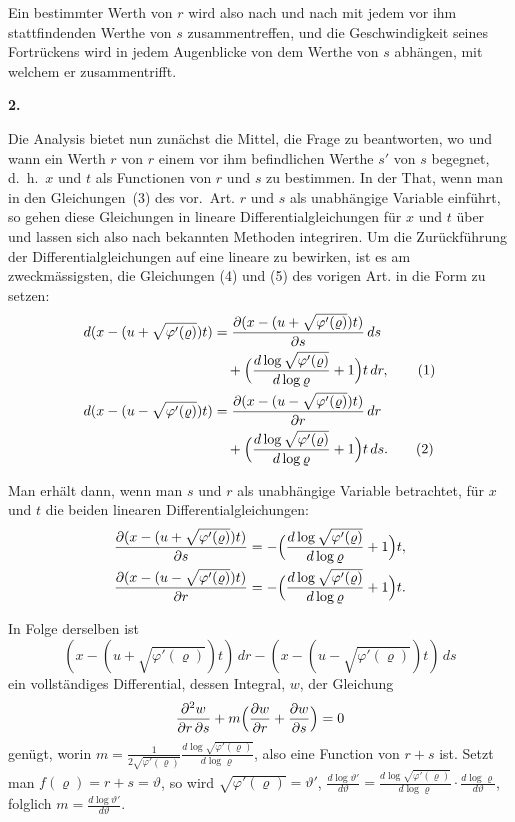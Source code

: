 \documentclass[12pt,a4paper]{article}
\begin{document}
Ein bestimmter Werth von $r$ wird also nach und nach mit jedem vor ihm stattfindenden Werthe von $s$ zusammentreffen, und die Geschwindigkeit seines Fortr\"uckens wird in jedem Augenblicke von dem Werthe von $s$ abh\"angen, mit welchem er zusammentrifft.

\newpage
\begin{center}
\textbf{2.}
\end{center}

Die Analysis bietet nun zun\"achst die Mittel, die Frage zu beantworten, wo und wann ein Werth $r$ von $r$ einem vor ihm befindlichen Werthe $s'$ von $s$ begegnet, d.~h.~$x$ und $t$ als Functionen von $r$ und $s$ zu bestimmen. In der That, wenn man in den Gleichungen~(3) des vor.~Art. $r$ und $s$ als unabh\"angige Variable einf\"uhrt, so gehen diese Gleichungen in lineare Differentialgleichungen f\"ur $x$ und $t$ \"uber und lassen sich also nach bekannten Methoden integriren. Um die Zur\"uckf\"uhrung der Differentialgleichungen auf eine lineare zu bewirken, ist es am zweckm\"assigsten, die Gleichungen (4) und (5) des vorigen Art. in die Form zu setzen:
\begin{align*}
d(x - (u + \sqrt{\varphi'(\varrho)})t) &= \frac{\partial(x - (u + \sqrt{\varphi'(\varrho)})t)}{\partial s}\,ds\\
&\quad + \Bigl(\frac{d\log\sqrt{\varphi'(\varrho)}}{d\log\varrho} + 1\Bigr)t\,dr,\tag{1}\\
d(x - (u - \sqrt{\varphi'(\varrho)})t) &= \frac{\partial(x - (u - \sqrt{\varphi'(\varrho)})t)}{\partial r}\,dr\\
&\quad + \Bigl(\frac{d\log\sqrt{\varphi'(\varrho)}}{d\log\varrho} + 1\Bigr)t\,ds.\tag{2}
\end{align*}

Man erh\"alt dann, wenn man $s$ und $r$ als unabh\"angige Variable betrachtet, f\"ur $x$ und $t$ die beiden linearen Differentialgleichungen:
\begin{align*}
\frac{\partial(x - (u + \sqrt{\varphi'(\varrho)})t)}{\partial s} &= -\Bigl(\frac{d\log\sqrt{\varphi'(\varrho)}}{d\log\varrho} + 1\Bigr)t,\\
\frac{\partial(x - (u - \sqrt{\varphi'(\varrho)})t)}{\partial r} &= -\Bigl(\frac{d\log\sqrt{\varphi'(\varrho)}}{d\log\varrho} + 1\Bigr)t.
\end{align*}

In Folge derselben ist
\begin{equation*}
(x - (u + \sqrt{\varphi'(\varrho)})t)\,dr - (x - (u - \sqrt{\varphi'(\varrho)})t)\,ds\tag{3}
\end{equation*}
ein vollst\"andiges Differential, dessen Integral, $w$, der Gleichung
\[
\frac{\partial^{2}w}{\partial r\,\partial s} + m\Bigl(\frac{\partial w}{\partial r} + \frac{\partial w}{\partial s}\Bigr) = 0
\]
gen\"ugt, worin $m = \frac{1}{2\sqrt{\varphi'(\varrho)}}\frac{d\log\sqrt{\varphi'(\varrho)}}{d\log\varrho}$, also eine Function von $r + s$ ist. Setzt man $f(\varrho) = r + s = \vartheta$, so wird $\sqrt{\varphi'(\varrho)} = \vartheta'$, $\frac{d\log\vartheta'}{d\vartheta} = \frac{d\log\sqrt{\varphi'(\varrho)}}{d\log\varrho} \cdot \frac{d\log\varrho}{d\vartheta}$, folglich $m = \frac{d\log\vartheta'}{d\vartheta}$.
\end{document}
